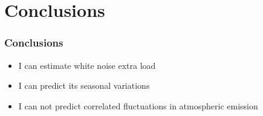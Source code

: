 \documentclass[10pt,aspectratio=169]{beamer}
\newcommand{\cmark}{\ding{51}}%
\newcommand{\xmark}{\ding{55}}%
\begin{document}
\section{Conclusions}

\begin{frame}[label=1]
\frametitle{Conclusions}

\begin{itemize}
        \item<1-> I can estimate \alert{white noise} extra load
        {\large \textcolor{green}{\cmark}}
        \item<2-> I can predict its \alert{seasonal variations}
        {\large \textcolor{green}{\cmark}}
        \item<3-> I can not predict \alert{correlated fluctuations} in
        atmospheric emission {\large \textcolor{red}{\xmark}}\\
\end{itemize}

\vspace{1.5cm}


\end{frame}
\end{document}
